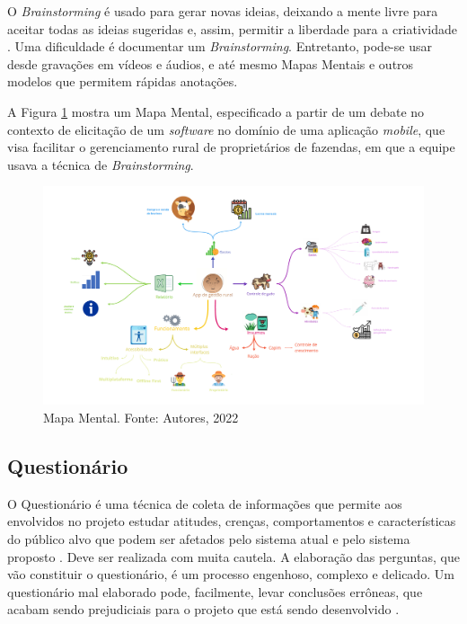 O \textit{Brainstorming} é usado para gerar novas ideias, deixando a mente livre para aceitar todas as ideias sugeridas e, assim, permitir a liberdade para a criatividade \cite{batista2003taxonomia}. Uma dificuldade é documentar um \textit{Brainstorming}. Entretanto, pode-se usar desde gravações em vídeos e áudios, e até mesmo Mapas Mentais e outros modelos que permitem rápidas anotações.

A Figura \ref{fig:mind_map} mostra um Mapa Mental, especificado a partir de um debate no contexto de elicitação de um \textit{software} no domínio de uma aplicação \textit{mobile}, que visa facilitar o gerenciamento rural de proprietários de fazendas, em que a equipe usava a técnica de \textit{Brainstorming}.

\begin{figure}[H]
    \begin{center}
        \includegraphics[scale=0.15]{figuras/Embasamento/MindMap.png}
        \caption{{Mapa Mental. Fonte: Autores, 2022}}
        \label{fig:mind_map}
    \end{center}
\end{figure}

\subsection{Questionário}

\label{sec:questionario}

O Questionário é uma técnica de coleta de informações que permite aos envolvidos no projeto estudar atitudes, crenças, comportamentos e características do público alvo que podem ser afetados pelo sistema atual e pelo sistema proposto \cite{kendall1992systems}. Deve ser realizada com muita cautela. A elaboração das perguntas, que vão constituir o questionário, é um processo engenhoso, complexo e delicado. Um questionário mal elaborado pode, facilmente, levar conclusões errôneas, que acabam sendo prejudiciais para o projeto que está sendo desenvolvido \cite{bastosjunior}.

